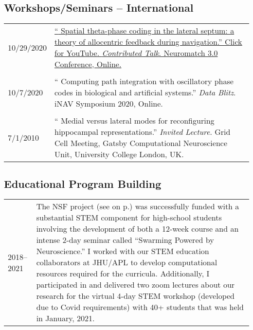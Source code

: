 \documentclass[10pt]{article}
\newcommand{\itemtitle}[1]{{\color{hopkinsblue}\ul{#1}}}
\newcommand{\unpubtitle}[1]{{\color{hopkinsblue} #1}}
\begin{document}
\subsection*{Workshops/Seminars -- International}

\begin{tabular}{@{\hspace{0.2in}}l>{\raggedright\arraybackslash}p{}}
  10/29/2020 \hspace{0.2in} &
  \href{https://www.youtube.com/watch?v=WwYDMpD7j4Q}{``\unpubtitle{Spatial
      theta-phase coding in the lateral septum: a theory of allocentric feedback
    during navigation}.'' \itemtitle{Click for YouTube}. \emph{Contributed Talk}.
  Neuromatch 3.0 Conference, Online. }\\
  \tabularnewline
  10/7/2020 \hspace{0.2in} & ``\unpubtitle{Computing path integration with
  oscillatory phase codes in biological and artificial systems}.'' \emph{Data
  Blitz}. iNAV Symposium 2020, Online.\\
  \tabularnewline
  7/1/2010 \hspace{0.2in} & ``\unpubtitle{Medial versus lateral modes for
  reconfiguring hippocampal representations}.'' \emph{Invited Lecture}. Grid
  Cell Meeting, Gatsby Computational Neuroscience Unit, University College
  London, UK.\\
\end{tabular}

\smallskip
\subsection*{Educational Program Building}

\begin{tabular}{@{\hspace{0.2in}}l>{\raggedright\arraybackslash}p{}}
  2018--2021 \hspace{0.1in} & The NSF project (see
  \emph{\nameref{sec:cursupport}} on p.\pageref{sec:cursupport}) was
  successfully funded with a substantial STEM component for high-school students
  involving the development of both a 12-week course and an intense 2-day
  seminar called ``Swarming Powered by Neuroscience.'' I worked with our STEM
  education collaborators at JHU/APL to develop computational resources required
  for the curricula. Additionally, I participated in and delivered two zoom
  lectures about our research for the virtual 4-day STEM workshop (developed due
  to Covid requirements) with 40+ students that was held in January, 2021.
\end{tabular}
\end{document}

